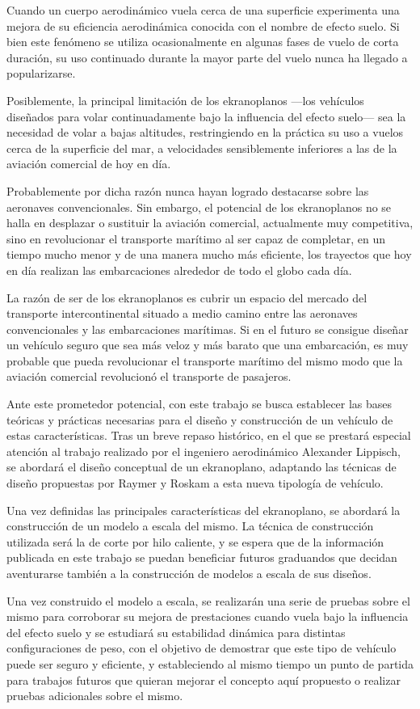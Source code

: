 Cuando un cuerpo aerodinámico vuela cerca de una superficie experimenta una mejora de su eficiencia aerodinámica conocida con el nombre de efecto suelo. Si bien este fenómeno se utiliza ocasionalmente en algunas fases de vuelo de corta duración, su uso continuado durante la mayor parte del vuelo nunca ha llegado a popularizarse.

Posiblemente, la principal limitación de los ekranoplanos —los vehículos diseñados para volar continuadamente bajo la influencia del efecto suelo— sea la necesidad de volar a bajas altitudes, restringiendo en la práctica su uso a vuelos cerca de la superficie del mar, a velocidades sensiblemente inferiores a las de la aviación comercial de hoy en día.

Probablemente por dicha razón nunca hayan logrado destacarse sobre las aeronaves convencionales. Sin embargo, el potencial de los ekranoplanos no se halla en desplazar o sustituir la aviación comercial, actualmente muy competitiva, sino en revolucionar el transporte marítimo al ser capaz de completar, en un tiempo mucho menor y de una manera mucho más eficiente, los trayectos que hoy en día realizan las embarcaciones alrededor de todo el globo cada día.

La razón de ser de los ekranoplanos es cubrir un espacio del mercado del transporte intercontinental situado a medio camino entre las aeronaves convencionales y las embarcaciones marítimas. Si en el futuro se consigue diseñar un vehículo seguro que sea más veloz y más barato que una embarcación, es muy probable que pueda revolucionar el transporte marítimo del mismo modo que la aviación comercial revolucionó el transporte de pasajeros.

Ante este prometedor potencial, con este trabajo se busca establecer las bases teóricas y prácticas necesarias para el diseño y construcción de un vehículo de estas características. Tras un breve repaso histórico, en el que se prestará especial atención al trabajo realizado por el ingeniero aerodinámico Alexander Lippisch, se abordará el diseño conceptual de un ekranoplano, adaptando las técnicas de diseño propuestas por Raymer\cite{ref:raymer}  y Roskam\cite{ref:roskam} a esta nueva tipología de vehículo.

Una vez definidas las principales características del ekranoplano, se abordará la construcción de un modelo a escala del mismo. La técnica de construcción utilizada será la de corte por hilo caliente, y se espera que de la información publicada en este trabajo se puedan beneficiar futuros graduandos que decidan aventurarse también a la construcción de modelos a escala de sus diseños.

Una vez construido el modelo a escala, se realizarán una serie de pruebas sobre el mismo para corroborar su mejora de prestaciones cuando vuela bajo la influencia del efecto suelo y se estudiará su estabilidad dinámica para distintas configuraciones de peso, con el objetivo de demostrar que este tipo de vehículo puede ser seguro y eficiente, y estableciendo al mismo tiempo un punto de partida para trabajos futuros que quieran mejorar el concepto aquí propuesto o realizar pruebas adicionales sobre el mismo.
